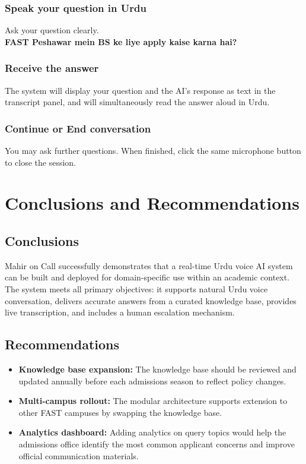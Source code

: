 \documentclass[12pt,a4paper]{report}
\begin{document}
\subsubsection{Speak your question in Urdu}
Ask your question clearly.\\ 
\textbf{FAST Peshawar mein BS ke liye apply kaise karna hai?}

\subsubsection{Receive the answer}
The system will display your question and the AI's response as text in the
transcript panel, and will simultaneously read the answer aloud in Urdu.

\subsubsection{Continue or End conversation}
You may ask further questions. When finished, click the same microphone button to close the session.


\newpage
\section{Conclusions and Recommendations}

\subsection{Conclusions}

Mahir on Call successfully demonstrates that a real-time Urdu voice
AI system can be built and deployed for domain-specific use within an academic context. The system meets all primary objectives: it supports natural Urdu voice conversation, delivers accurate answers from a curated knowledge base, provides live transcription, and includes a human escalation mechanism.


\subsection{Recommendations}

\begin{itemize}
  \item \textbf{Knowledge base expansion:} 
        The knowledge base should be reviewed and updated annually before each admissions season to reflect
        policy changes.
  \item \textbf{Multi-campus rollout:} The modular architecture supports
        extension to other FAST campuses by swapping the knowledge base.
  \item \textbf{Analytics dashboard:} Adding analytics on query topics would
        help the admissions office identify the most common applicant concerns and improve official communication materials.
\end{itemize}
\end{document}

